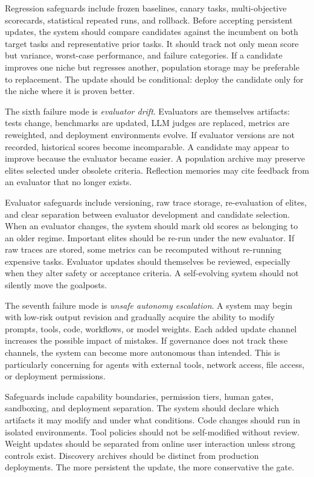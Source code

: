 Regression safeguards include frozen baselines, canary tasks, multi-objective scorecards, statistical repeated runs, and rollback.  Before accepting persistent updates, the system should compare candidates against the incumbent on both target tasks and representative prior tasks.  It should track not only mean score but variance, worst-case performance, and failure categories.  If a candidate improves one niche but regresses another, population storage may be preferable to replacement.  The update should be conditional: deploy the candidate only for the niche where it is proven better.

The sixth failure mode is \emph{evaluator drift}.  Evaluators are themselves artifacts: tests change, benchmarks are updated, LLM judges are replaced, metrics are reweighted, and deployment environments evolve.  If evaluator versions are not recorded, historical scores become incomparable.  A candidate may appear to improve because the evaluator became easier.  A population archive may preserve elites selected under obsolete criteria.  Reflection memories may cite feedback from an evaluator that no longer exists.

Evaluator safeguards include versioning, raw trace storage, re-evaluation of elites, and clear separation between evaluator development and candidate selection.  When an evaluator changes, the system should mark old scores as belonging to an older regime.  Important elites should be re-run under the new evaluator.  If raw traces are stored, some metrics can be recomputed without re-running expensive tasks.  Evaluator updates should themselves be reviewed, especially when they alter safety or acceptance criteria.  A self-evolving system should not silently move the goalposts.

The seventh failure mode is \emph{unsafe autonomy escalation}.  A system may begin with low-risk output revision and gradually acquire the ability to modify prompts, tools, code, workflows, or model weights.  Each added update channel increases the possible impact of mistakes.  If governance does not track these channels, the system can become more autonomous than intended.  This is particularly concerning for agents with external tools, network access, file access, or deployment permissions.

Safeguards include capability boundaries, permission tiers, human gates, sandboxing, and deployment separation.  The system should declare which artifacts it may modify and under what conditions.  Code changes should run in isolated environments.  Tool policies should not be self-modified without review.  Weight updates should be separated from online user interaction unless strong controls exist.  Discovery archives should be distinct from production deployments.  The more persistent the update, the more conservative the gate.

